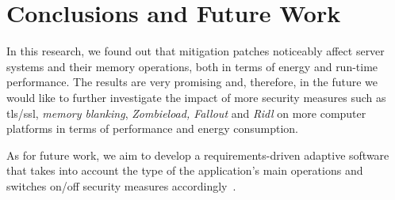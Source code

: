 \documentclass[sigconf, screen]{acmart}
\begin{document}
\section{Conclusions and Future Work}
In this research, we found out that mitigation patches noticeably affect server systems
and their memory operations, both in terms of energy and run-time performance.
The results are very promising and, therefore, in the future we would like to further
investigate the impact of more security measures such as {\sc tls/ssl}, {\it memory blanking}, 
{\it Zombieload, Fallout} and {\it Ridl} on more computer platforms  in terms of performance
and energy consumption.

As for future work, we aim to develop a requirements-driven adaptive software that takes into
account the type of the application's main operations and switches on/off security measures 
accordingly~\cite{adaptive_security}.




\end{document}
